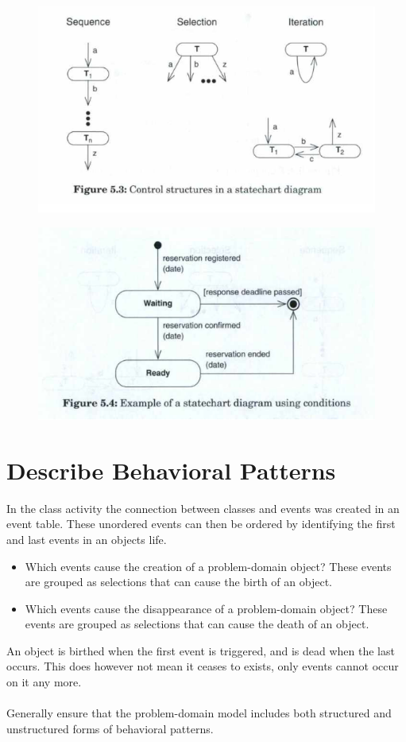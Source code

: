 \begin{figure}[H]
    \centering
    \includegraphics[width=\linewidth]{parts/2_problem_domain_analysis/behavior/figures/statechart.png}
\end{figure}

\begin{figure}[H]
    \centering
    \includegraphics[width=\linewidth]{parts/2_problem_domain_analysis/behavior/figures/condtion_statechart.png}
\end{figure}

\section{Describe Behavioral Patterns \ooad[98]}
In the class activity the connection between classes and events was created in an event table. These unordered events can then be ordered by identifying the first and last events in an objects life.
\begin{itemize}
    \item Which events cause the creation of a problem-domain object? These events are grouped as selections that can cause the birth of an object.
    \item Which events cause the disappearance of a problem-domain object? These events are grouped as selections that can cause the death of an object.
\end{itemize}
An object is birthed when the first event is triggered, and is dead when the last occurs. This does however not mean it ceases to exists, only events cannot occur on it any more.
\\\\
Generally ensure that the problem-domain model includes both structured and unstructured forms of behavioral patterns.

